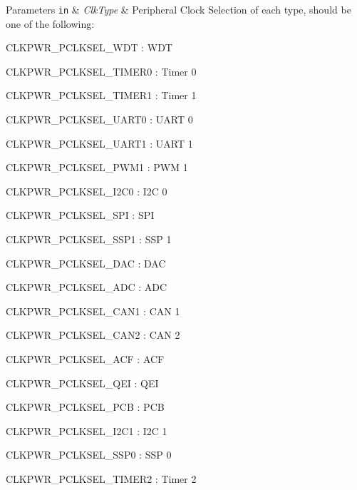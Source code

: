 \begin{DoxyParams}[1]{\-Parameters}
\mbox{\tt in}  & {\em \-Clk\-Type} & \-Peripheral \-Clock \-Selection of each type, should be one of the following\-:
\begin{DoxyItemize}
\item \-C\-L\-K\-P\-W\-R\-\_\-\-P\-C\-L\-K\-S\-E\-L\-\_\-\-W\-D\-T \-: \-W\-D\-T
\item \-C\-L\-K\-P\-W\-R\-\_\-\-P\-C\-L\-K\-S\-E\-L\-\_\-\-T\-I\-M\-E\-R0 \-: \-Timer 0
\item \-C\-L\-K\-P\-W\-R\-\_\-\-P\-C\-L\-K\-S\-E\-L\-\_\-\-T\-I\-M\-E\-R1 \-: \-Timer 1
\item \-C\-L\-K\-P\-W\-R\-\_\-\-P\-C\-L\-K\-S\-E\-L\-\_\-\-U\-A\-R\-T0 \-: \-U\-A\-R\-T 0
\item \-C\-L\-K\-P\-W\-R\-\_\-\-P\-C\-L\-K\-S\-E\-L\-\_\-\-U\-A\-R\-T1 \-: \-U\-A\-R\-T 1
\item \-C\-L\-K\-P\-W\-R\-\_\-\-P\-C\-L\-K\-S\-E\-L\-\_\-\-P\-W\-M1 \-: \-P\-W\-M 1
\item \-C\-L\-K\-P\-W\-R\-\_\-\-P\-C\-L\-K\-S\-E\-L\-\_\-\-I2\-C0 \-: \-I2\-C 0
\item \-C\-L\-K\-P\-W\-R\-\_\-\-P\-C\-L\-K\-S\-E\-L\-\_\-\-S\-P\-I \-: \-S\-P\-I
\item \-C\-L\-K\-P\-W\-R\-\_\-\-P\-C\-L\-K\-S\-E\-L\-\_\-\-S\-S\-P1 \-: \-S\-S\-P 1
\item \-C\-L\-K\-P\-W\-R\-\_\-\-P\-C\-L\-K\-S\-E\-L\-\_\-\-D\-A\-C \-: \-D\-A\-C
\item \-C\-L\-K\-P\-W\-R\-\_\-\-P\-C\-L\-K\-S\-E\-L\-\_\-\-A\-D\-C \-: \-A\-D\-C
\item \-C\-L\-K\-P\-W\-R\-\_\-\-P\-C\-L\-K\-S\-E\-L\-\_\-\-C\-A\-N1 \-: \-C\-A\-N 1
\item \-C\-L\-K\-P\-W\-R\-\_\-\-P\-C\-L\-K\-S\-E\-L\-\_\-\-C\-A\-N2 \-: \-C\-A\-N 2
\item \-C\-L\-K\-P\-W\-R\-\_\-\-P\-C\-L\-K\-S\-E\-L\-\_\-\-A\-C\-F \-: \-A\-C\-F
\item \-C\-L\-K\-P\-W\-R\-\_\-\-P\-C\-L\-K\-S\-E\-L\-\_\-\-Q\-E\-I \-: \-Q\-E\-I
\item \-C\-L\-K\-P\-W\-R\-\_\-\-P\-C\-L\-K\-S\-E\-L\-\_\-\-P\-C\-B \-: \-P\-C\-B
\item \-C\-L\-K\-P\-W\-R\-\_\-\-P\-C\-L\-K\-S\-E\-L\-\_\-\-I2\-C1 \-: \-I2\-C 1
\item \-C\-L\-K\-P\-W\-R\-\_\-\-P\-C\-L\-K\-S\-E\-L\-\_\-\-S\-S\-P0 \-: \-S\-S\-P 0
\item \-C\-L\-K\-P\-W\-R\-\_\-\-P\-C\-L\-K\-S\-E\-L\-\_\-\-T\-I\-M\-E\-R2 \-: \-Timer 2

\end{DoxyItemize}
\end{DoxyParams}
